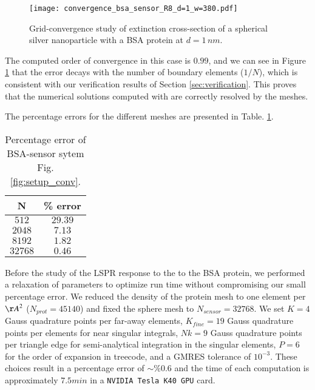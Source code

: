\begin{figure}[h] %
   \centering
   \texttt{[image: convergence\_bsa\_sensor\_R8\_d=1\_w=380.pdf]} 
   \caption{Grid-convergence study of extinction cross-section of a spherical silver
            nanoparticle with a BSA protein at $d=1 \, nm$.}
   \label{fig:error_sphere-bsa}
\end{figure}

The computed order of convergence in this case is $0.99$, and we can see in 
Figure \ref{fig:error_sphere-bsa} that the error decays with the number
of boundary elements ($1/N$), which is consistent with our verification 
results of Section \ref{sec:verification}. This proves that the
numerical solutions computed with \pygbe are correctly resolved by the meshes.

The percentage errors for the different meshes are presented in Table. \ref{table:err_bsa_sensor}.

\begin{table}[h]
    \centering
    \caption{\label{table:err_bsa_sensor} Percentage error of BSA-sensor sytem Fig.\ref{fig:setup_conv}.} 
    \begin{tabular}{c c}
    \hline%
    N & \% error \\
    \hline%
     $512$ & $29.39$ \\
     $2048$ & $7.13$ \\
     $8192$ & $1.82$ \\
     $32768$ & $0.46$ \\
    \hline%
    \end{tabular}
\end{table}

Before the study of the LSPR response to the to the BSA protein, we performed a 
relaxation of parameters to optimize run time without compromising our small
percentage error. We reduced the density of the protein mesh to one element per
${\AA}^2$ ($N_{prot}=45140$) and fixed the sphere mesh to $N_{sensor}=32768$. We
set $K=4$ Gauss quadrature points per far-away elements, $K_{fine} = 19$ Gauss
quadrature points per elements for near singular integrals, $Nk = 9$ Gauss 
quadrature points per triangle edge for semi-analytical integration in the 
singular elements, $P=6$ for the order of expansion in treecode, and a GMRES 
tolerance of $10^{-3}$. These choices result in a percentage error of $\sim\%0.6$
and the time of each computation is approximately $7.5 min$ in a \texttt{NVIDIA Tesla K40 GPU}
card. 



